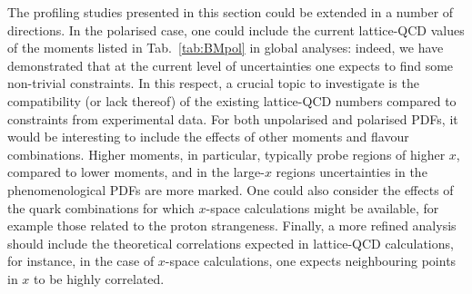 The profiling studies presented in this section could be extended in
a number of directions.
%
In the polarised case, one could include the current lattice-QCD
values of the moments listed in Tab.~\ref{tab:BMpol} in global analyses: 
indeed, we have demonstrated that at the current level of uncertainties one 
expects to find some non-trivial constraints.
%
In this respect, a crucial topic to investigate is the compatibility 
(or lack thereof) of the existing lattice-QCD numbers compared to constraints 
from experimental data.
%
For both unpolarised and polarised PDFs, it would be interesting to include the 
effects of other moments and flavour combinations.
%
Higher moments, in particular, typically probe regions of higher $x$, compared
to lower moments, and in the large-$x$ regions uncertainties in the phenomenological PDFs are
more marked.
%
One could also consider the effects of the quark combinations for which $x$-space
calculations might be available, for example those related to the proton strangeness.
%
Finally, a more refined analysis should include the theoretical correlations
expected in lattice-QCD calculations, for instance, in the case of $x$-space calculations,
one expects neighbouring points in $x$ to be highly correlated.

